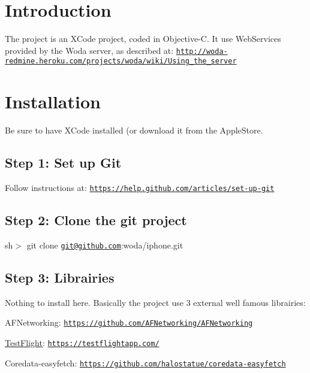 \hypertarget{index_intro_sec}{}\section{Introduction}\label{index_intro_sec}
The project is an X\-Code project, coded in Objective-\/\-C. It use Web\-Services provided by the Woda server, as described at\-: \href{http://woda-redmine.heroku.com/projects/woda/wiki/Using_the_server}{\tt http\-://woda-\/redmine.\-heroku.\-com/projects/woda/wiki/\-Using\-\_\-the\-\_\-server}\hypertarget{index_install_sec}{}\section{Installation}\label{index_install_sec}
Be sure to have X\-Code installed (or download it from the Apple\-Store.\hypertarget{index_step1}{}\subsection{Step 1\-: Set up Git}\label{index_step1}
Follow instructions at\-: \href{https://help.github.com/articles/set-up-git}{\tt https\-://help.\-github.\-com/articles/set-\/up-\/git}\hypertarget{index_step2}{}\subsection{Step 2\-: Clone the git project}\label{index_step2}
sh$>$ git clone \href{mailto:git@github.com}{\tt git@github.\-com}\-:woda/iphone.\-git\hypertarget{index_step3}{}\subsection{Step 3\-: Librairies}\label{index_step3}
Nothing to install here. Basically the project use 3 external well famous librairies\-:
\begin{DoxyItemize}
\item A\-F\-Networking\-: \href{https://github.com/AFNetworking/AFNetworking}{\tt https\-://github.\-com/\-A\-F\-Networking/\-A\-F\-Networking}
\item \hyperlink{interface_test_flight}{Test\-Flight}\-: \href{https://testflightapp.com/}{\tt https\-://testflightapp.\-com/}
\item Coredata-\/easyfetch\-: \href{https://github.com/halostatue/coredata-easyfetch}{\tt https\-://github.\-com/halostatue/coredata-\/easyfetch} 
\end{DoxyItemize}